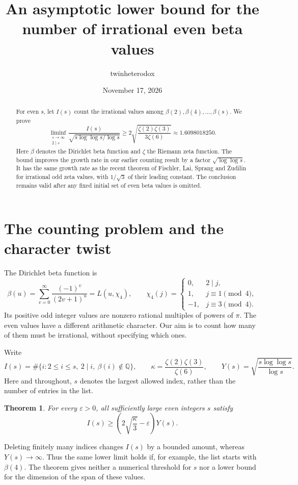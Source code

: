 \documentclass[11pt]{article}
\title{\Large An asymptotic lower bound for the number of irrational even beta values}
\author{twinheterodox}
\date{November 17, 2026}
\newtheorem{theorem}{Theorem}[section]
\theoremstyle{remark}
\newcommand{\Q}{\mathbb Q}
\numberwithin{equation}{section}
\begin{document}
\maketitle

\begin{abstract}
For even $s$, let $I(s)$ count the irrational values among
$\beta(2),\beta(4),\ldots,\beta(s)$. We prove
\[
 \liminf_{\substack{s\to\infty\\2\mid s}}
 \frac{I(s)}{\sqrt{s\log\log s/\log s}}
 \geq 2\sqrt{\frac{\zeta(2)\zeta(3)}{3\zeta(6)}}
 \approx 1.6098018250 .
\]
Here $\beta$ denotes the Dirichlet beta function and $\zeta$ the Riemann
zeta function. The bound improves
the growth rate in our earlier
counting result by a factor $\sqrt{\log\log s}$. It has the same growth
rate as the recent theorem of Fischler, Lai, Sprang and Zudilin for
irrational odd zeta values, with $1/\sqrt3$ of their leading constant.
The conclusion remains valid after any fixed initial set of even beta
values is omitted.
\end{abstract}

\section{The counting problem and the character twist}
The Dirichlet beta function is
\[
 \beta(u)=\sum_{v=0}^{\infty}\frac{(-1)^v}{(2v+1)^u}
         =L(u,\chi_4),\qquad
 \chi_4(j)=
 \begin{cases}
  0,&2\mid j,\\
  1,&j\equiv1\pmod4,\\
 -1,&j\equiv3\pmod4.
 \end{cases}
\]
Its positive odd integer values are nonzero rational multiples of powers
of $\pi$. The even values have a different arithmetic character. Our aim
is to count how many of them must be irrational, without specifying
which ones.

Write
\[
 I(s)=\#\{i:2\leq i\leq s,\ 2\mid i,\ \beta(i)\notin\Q\},\qquad
 \kappa=\frac{\zeta(2)\zeta(3)}{\zeta(6)},\qquad
 Y(s)=\sqrt{\frac{s\log\log s}{\log s}}.
\]
Here and throughout, $s$ denotes the largest allowed index, rather than
the number of entries in the list.

\begin{theorem}\label{thm:main}
For every $\varepsilon>0$, all sufficiently large even integers $s$ satisfy
\[
 I(s)\geq\left(2\sqrt{\frac{\kappa}{3}}-\varepsilon\right)Y(s).
\]
\end{theorem}

Deleting finitely many indices changes $I(s)$ by a bounded amount, whereas
$Y(s)\to\infty$. Thus the same lower limit holds if, for example, the list
starts with $\beta(4)$. The theorem gives neither a numerical threshold for
$s$ nor a lower bound for the dimension of the span of these values.
\end{document}
